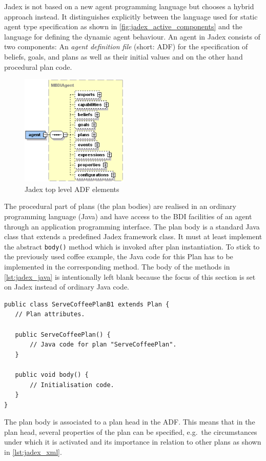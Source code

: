 Jadex is not based on a new agent programming language but chooses a hybrid approach instead.
It distinguishes explicitly between the language used for static agent type specification as shown in \autoref{fig:jadex_active_components} and the language for defining the dynamic agent behaviour.
An agent in Jadex consists of two components: An \emph{agent definition file} (short: ADF) for the specification of beliefs, goals, and plans as well as their initial values and on the other hand procedural plan code.
\begin{figure}
	\centering
	\includegraphics[height=200px]{images/jadexagentadf.png}
  \caption{Jadex top level ADF elements \cite{ActiveComponents}}
	\label{fig:jadex_active_components}
\end{figure}
The procedural part of plans (the plan bodies) are realised in an ordinary programming language (Java) and have access to the BDI facilities of an agent through an application programming interface.
The plan body is a standard Java class that extends a predefined Jadex framework class.
It must at least implement the abstract \texttt{body()} method which is invoked after plan instantiation.
To stick to the previously used coffee example, the Java code for this Plan has to be implemented in the corresponding method.
The body of the methods in \autoref{lst:jadex_java} is intentionally left blank because the focus of this section is set on Jadex instead of ordinary Java code.
\begin{lstlisting}[caption={Jadex Java class.}, label=lst:jadex_java]
public class ServeCoffeePlanB1 extends Plan {
   // Plan attributes.

   public ServeCoffeePlan() {
       // Java code for plan "ServeCoffeePlan".
   }

   public void body() {
       // Initialisation code.
   }
}
\end{lstlisting}
The plan body is associated to a plan head in the ADF.
This means that in the plan head, several properties of the plan can be specified, e.g.\ the circumstances under which it is activated and its importance in relation to other plans as shown in \autoref{lst:jadex_xml}.
